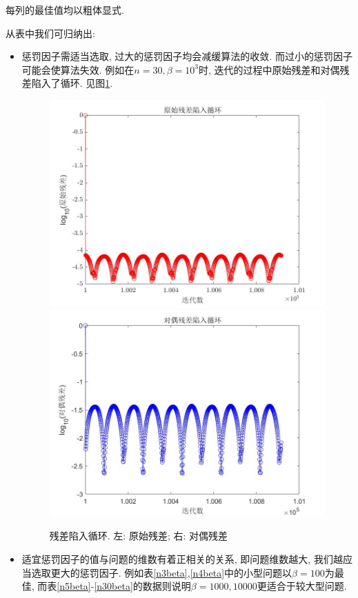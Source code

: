 \documentclass[UTF8,10.5pt,a4paper]{ctexart}
\theoremstyle{definition}
\theoremstyle{definition}
\begin{document}
每列的最佳值均以粗体显式. 
\par 从表中我们可归纳出:
\begin{itemize}
\item 惩罚因子需适当选取, 过大的惩罚因子均会减缓算法的收敛. 而过小的惩罚因子可能会使算法失效. 例如在$n=30,\beta=10^3$时, 迭代的过程中原始残差和对偶残差陷入了循环. 见图\ref{loop}.
\begin{figure}[htbp]
	\renewcommand{\captionfont}{\small}
	\centering
	\includegraphics[width=.37\paperwidth]{primalres.jpg}
	\includegraphics[width=.37\paperwidth]{dualres.jpg}
	\caption{残差陷入循环. 左: 原始残差; 右: 对偶残差}
	\label{loop}
\end{figure}
\item 适宜惩罚因子的值与问题的维数有着正相关的关系, 即问题维数越大, 我们越应当选取更大的惩罚因子. 例如表\ref{n3beta},\ref{n4beta}中的小型问题以$\beta=100$为最佳, 而表\ref{n5beta}-\ref{n30beta}的数据则说明$\beta=1000,10000$更适合于较大型问题.
\end{itemize}
\end{document}

